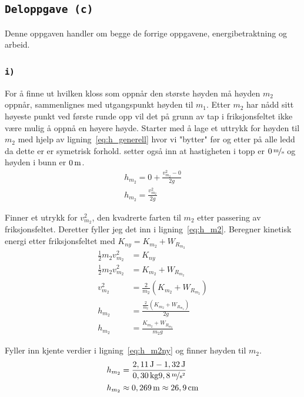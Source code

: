 \documentclass{article}
\let\oldsubsection\subsection
\renewcommand{\subsection}[1]{%
  \oldsubsection{\texttt{#1}}%
  \setcounter{subsubsection}{-1}%
}
\let\oldsubsubsection\subsubsection
\renewcommand{\subsubsection}[1]{%
  \oldsubsubsection{\texttt{#1}}%
}
\begin{document}
\clearpage
\subsection{Deloppgave (c)}
Denne oppgaven handler om begge de forrige oppgavene, energibetraktning og arbeid.

\subsubsection{i)}
For å finne ut hvilken kloss som oppnår den største høyden må høyden \(m_2\) oppnår, sammenlignes med utgangspunkt høyden til \(m_1\). Etter \(m_2\) har nådd sitt høyeste punkt ved første runde opp vil det på grunn av tap i friksjonsfeltet ikke være mulig å oppnå en høyere høyde. Starter med å lage et uttrykk for høyden til \(m_2\) med hjelp av ligning~\ref{eq:h_generell} hvor vi "bytter" før og etter på alle ledd da dette er er symetrisk forhold. setter også inn at hastigheten i topp er \(\unitfrac[0]{m}{s}\) og høyden i bunn er \(\unit[0]{m}\).
\begin{equation}
\begin{split}
    h_{m_2} = 0 + \frac{v^2_{m_2} - 0}{2 g} \\
    h_{m_2} = \frac{v^2_{m_2}}{2 g}
\end{split}
\label{eq:h_m2}
\end{equation}

Finner et utrykk for \(v^2_{m_2}\), den kvadrerte farten til \(m_2\) etter passering av friksjonsfeltet. Deretter fyller jeg det inn i ligning~\ref{eq:h_m2}. Beregner kinetisk energi etter friksjonsfeltet med \(K_{ny} = K_{m_2} + W_{R_{m_2}}\)
\begin{equation}
\begin{split}
    \frac{1}{2} m_2 v^2_{m_2} &= K_{ny} \\
    \frac{1}{2} m_2 v^2_{m_2} &= K_{m_2} + W_{R_{m_2}}\\
    v^2_{m_2} &= \frac{2}{m_2}(K_{m_2} + W_{R_{m_2}}) \\
    h_{m_2} &= \frac{\frac{2}{m_2}(K_{m_2} + W_{R_{m_2}})}{2 g} \\
    h_{m_2} &= \frac{K_{m_2} + W_{R_{m_2}}}{m_2 g}
\end{split}
\label{eq:h_m2ny}
\end{equation}

Fyller inn kjente verdier i ligning~\ref{eq:h_m2ny} og finner høyden til \(m_2\).
\begin{equation*}
\begin{split}
    h_{m_2} &= \frac{\unit[2,11]{J} - \unit[1,32]{J}}{\unit[0,30]{kg} \unitfrac[9,8]{m}{s^2}} \\
    h_{m_2} &\approx \unit[0,269]{m} \approx \unit[26,9]{cm}
\end{split}
\end{equation*}
\end{document}

